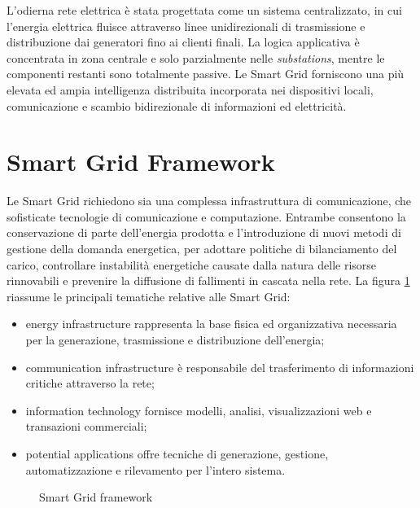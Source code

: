 L'odierna rete elettrica è stata progettata come un sistema centralizzato, in cui l'energia elettrica fluisce attraverso linee unidirezionali di trasmissione e distribuzione dai generatori fino ai clienti finali. La logica applicativa è concentrata in zona centrale e solo parzialmente nelle \emph{substations}, mentre le componenti restanti sono totalmente passive. Le Smart Grid forniscono una più elevata ed ampia intelligenza distribuita incorporata nei dispositivi locali, comunicazione e scambio bidirezionale di informazioni ed elettricità.

\section{Smart Grid Framework}
Le Smart Grid richiedono sia una complessa infrastruttura di comunicazione, che sofisticate tecnologie di comunicazione e computazione. Entrambe consentono la conservazione di parte dell'energia prodotta e l'introduzione di nuovi metodi di gestione della domanda energetica, per adottare politiche di bilanciamento del carico, controllare instabilità energetiche causate dalla natura delle risorse rinnovabili e prevenire la diffusione di fallimenti in cascata nella rete. 
\newline 
La figura \ref{fig:1} riassume le principali tematiche relative alle Smart Grid:
\begin{itemize}
	\item energy infrastructure rappresenta la base fisica ed organizzativa necessaria per la generazione, trasmissione e distribuzione dell'energia;
	\item communication infrastructure è responsabile del trasferimento di informazioni critiche attraverso la rete;
	\item information technology fornisce modelli, analisi, visualizzazioni web e transazioni commerciali;
	\item potential applications offre tecniche di generazione, gestione, automatizzazione e rilevamento per l'intero sistema.
\end{itemize} 

\begin{figure}[h] 
\caption{Smart Grid framework}\label{fig:1}
\end{figure}


